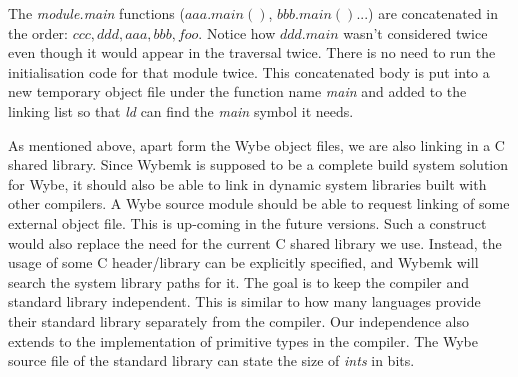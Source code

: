 The \textit{module.main} functions ($aaa.main()$, $bbb.main()$...) are
concatenated in the order: $ccc,ddd,aaa,bbb,foo$. Notice how $ddd.main$ wasn't
considered twice even though it would appear in the traversal twice. There is
no need to run the initialisation code for that module twice. This concatenated
body is put into a new temporary object file under the function name
\textit{main} and added to the linking list so that \textit{ld} can find the
\textit{main} symbol it needs.


As mentioned above, apart form the Wybe object files, we are also linking in a
C shared library. Since Wybemk is supposed to be a complete build system
solution for Wybe, it should also be able to link in dynamic system libraries
built with other compilers. A Wybe source module should be able to request
linking of some external object file. This is up-coming in the future
versions. Such a construct would also replace the need for the current C shared
library we use. Instead, the usage of some C header/library can be explicitly
specified, and Wybemk will search the system library paths for it. The goal is
to keep the compiler and standard library independent. This is similar to how
many languages provide their standard library separately from the compiler. Our
independence also extends to the implementation of primitive types in the
compiler. The Wybe source file of the standard library can state the size of
\textit{ints} in bits.





